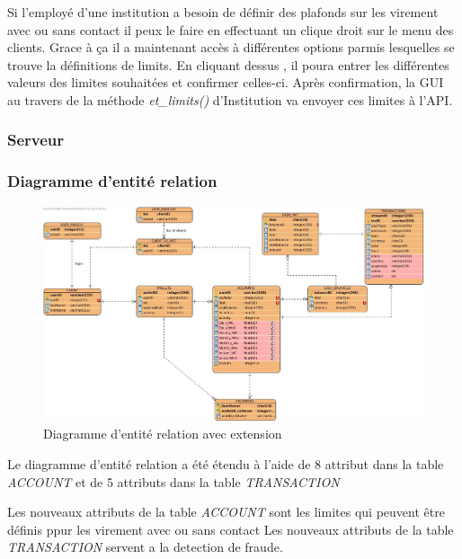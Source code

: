 \documentclass[../rapport.tex]{subfiles}
\begin{document}
				Si l'employé d'une institution a besoin de définir des plafonds sur les virement avec ou sans contact il peux le faire en effectuant un clique droit sur le menu des clients.
                Grace à ça il a maintenant accès à différentes options parmis lesquelles se trouve la définitions de limits. En cliquant dessus , il poura entrer les différentes valeurs
                des limites souhaitées et confirmer celles-ci. Après confirmation, la GUI au travers de la méthode \textit{et_limits()} d'Institution va envoyer ces limites à l'API.
                
\newpage
		\subsubsection{Serveur}
		\subsubsection{Diagramme d'entité relation}

				\begin{figure}[h]
						\centering\includegraphics[scale=0.25]{ressources/photos_diagrammes/extensionChristian/erd/EntityRelationshipDiagram1.jpg}
						\caption{Diagramme d'entité relation avec extension}
				\end{figure}
		Le diagramme d'entité relation a été étendu à l'aide de 8 attribut dans la table \textit{ACCOUNT} et de 5 attributs dans la table \textit{TRANSACTION}
				
		\medskip

		Les nouveaux attributs de la table \textit{ACCOUNT} sont les limites qui peuvent être définis ppur les virement avec ou sans contact 
        Les nouveaux attributs de la table \textit{TRANSACTION} servent a la detection de fraude.

		
\end{document}
